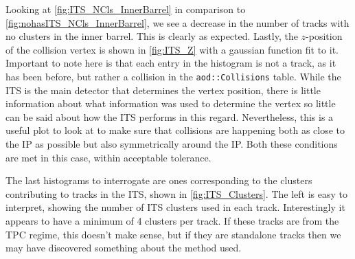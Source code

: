 Looking at \cref{fig:ITS_NCls_InnerBarrel} in comparison to \cref{fig:nohasITS_NCls_InnerBarrel}, we see a decrease in the number of tracks with no clusters in the inner barrel. This is clearly as expected. Lastly, the $z$-position of the collision vertex is shown in \cref{fig:ITS_Z} with a gaussian function fit to it. Important to note here is that each entry in the histogram is not a track, as it has been before, but rather a collision in the \texttt{aod::Collisions} table. While the ITS is the main detector that determines the vertex position, there is little information about what information was used to determine the vertex so little can be said about how the ITS performs in this regard. Nevertheless, this is a useful plot to look at to make sure that collisions are happening both as close to the IP as possible but also symmetrically around the IP. Both these conditions are met in this case, within acceptable tolerance. 

\bigskip

The last histograms to interrogate are ones corresponding to the clusters contributing to tracks in the ITS, shown in \cref{fig:ITS_Clusters}. The left is easy to interpret, showing the number of ITS clusters used in each track. Interestingly it appears to have a minimum of 4 clusters per track. If these tracks are from the TPC regime, this doesn't make sense, but if they are standalone tracks then we may have discovered something about the method used.

